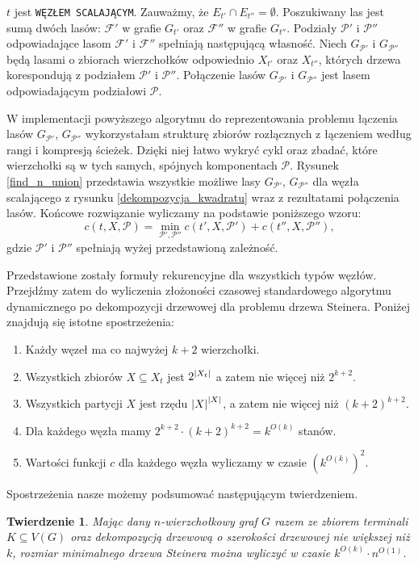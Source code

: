 \documentclass[12pt, oneside]{report}
\newtheorem{theorem}{Twierdzenie}
\newcommand\Omicron{O}
\begin{document}
$t$ jest \texttt{WĘZŁEM SCALAJĄCYM}. Zauważmy, że $E_{t'} \cap E_{t''} = \emptyset$. Poszukiwany las jest sumą dwóch lasów: $\mathcal{F}'$ w grafie $G_{t'}$ oraz $\mathcal{F}''$ w grafie $G_{t''}$. Podziały $\mathcal{P}'$ i $\mathcal{P}''$ odpowiadające lasom $\mathcal{F}'$ i $\mathcal{F}''$ spełniają następującą własność. Niech $G_{\mathcal{P}'}$ i $G_{\mathcal{P}''}$ będą lasami o zbiorach wierzchołków odpowiednio $X_{t'}$ oraz $X_{t''}$, których drzewa korespondują z podziałem $\mathcal{P'}$ i $\mathcal{P''}$. Połączenie lasów $G_{\mathcal{P}'}$ i $G_{\mathcal{P}''}$ jest lasem odpowiadającym podziałowi $\mathcal{P}$.

W implementacji powyższego algorytmu do reprezentowania problemu łączenia lasów $G_{\mathcal{P}'}$, $G_{\mathcal{P}''}$ wykorzystałam strukturę zbiorów rozłącznych z łączeniem według rangi i kompresją ścieżek. Dzięki niej łatwo wykryć cykl oraz zbadać, które wierzchołki są w tych samych, spójnych komponentach $\mathcal{P}$. Rysunek \ref{find_n_union} przedstawia wszystkie możliwe lasy $G_{\mathcal{P}'}$, $G_{\mathcal{P}''}$ dla węzła scalającego z rysunku \ref{dekompozycja_kwadratu} wraz z rezultatami połączenia lasów.
Końcowe rozwiązanie wyliczamy na podstawie poniższego wzoru:
$$c(t, X, \mathcal{P}) = \min \limits_{\mathcal{P}', \mathcal{P}''} c(t', X, \mathcal{P}') + c(t'', X, \mathcal{P}''),$$ gdzie $\mathcal{P}'$ i $\mathcal{P''}$ spełniają wyżej przedstawioną zależność.

Przedstawione zostały formuły rekurencyjne dla wszystkich typów węzłów. Przejdźmy zatem do wyliczenia złożoności czasowej standardowego algorytmu dynamicznego po dekompozycji drzewowej dla problemu drzewa Steinera. Poniżej znajdują się istotne spostrzeżenia:
\begin{enumerate}[label=(\alph*)]
\item Każdy węzeł ma co najwyżej $k+2$ wierzchołki.
\item Wszystkich zbiorów $X \subseteq X_t$ jest $2^{\abs{X_t}}$ a zatem nie więcej niż $2^{k+2}$.
\item Wszystkich partycji $X$ jest rzędu $\abs{X}^{\abs{X}}$, a zatem nie więcej niż $(k+2)^{k+2}$.
\item Dla każdego węzła mamy $2^{k+2} \cdot (k+2)^{k+2} = k^{\Omicron(k)}$ stanów.
\item Wartości funkcji $c$ dla każdego węzła wyliczamy w czasie $(k^{\Omicron(k)})^2$.
\end{enumerate}
Spostrzeżenia nasze możemy podsumować następującym twierdzeniem. 
\begin{theorem}
Mając dany $n$-wierzchołkowy graf $G$ razem ze zbiorem terminali $K \subseteq V(G)$ oraz dekompozycją drzewową o szerokości drzewowej nie większej niż $k$, rozmiar minimalnego drzewa Steinera można wyliczyć w czasie $k^{\Omicron(k)} \cdot n^{\Omicron{(1)}}$. 
\end{theorem}
\end{document}
